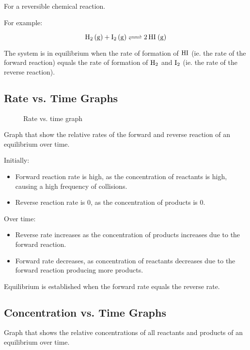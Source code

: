 \documentclass[a4paper,11pt]{article}
\begin{document}
For a reversible chemical reaction.

For example:

$$
\ce{H2 (g) + I2 (g) <=> 2HI (g)}
$$

The system is in equilibrium when the rate of formation of $\ce{HI}$ (ie. the
rate of the forward reaction) equals the rate of formation of $\ce{H2}$ and
$\ce{I2}$ (ie. the rate of the reverse reaction).


\subsection{Rate vs. Time Graphs}

\begin{figure}
\begin{center}
\caption{Rate vs. time graph}
\end{center}
\end{figure}

Graph that show the relative rates of the forward and reverse reaction of an
equilibrium over time.

Initially:

\begin{itemize}
\item Forward reaction rate is high, as the concentration of reactants is high,
	causing a high frequency of collisions.
\item Reverse reaction rate is 0, as the concentration of products is 0.
\end{itemize}

Over time:

\begin{itemize}
\item Reverse rate increases as the concentration of products increases due to
	the forward reaction.
\item Forward rate decreases, as concentration of reactants decreases due to
	the forward reaction producing more products.
\end{itemize}

Equilibrium is established when the forward rate equals the reverse rate.


\subsection{Concentration vs. Time Graphs}

Graph that shows the relative concentrations of all reactants and products of
an equilibrium over time.
\end{document}
